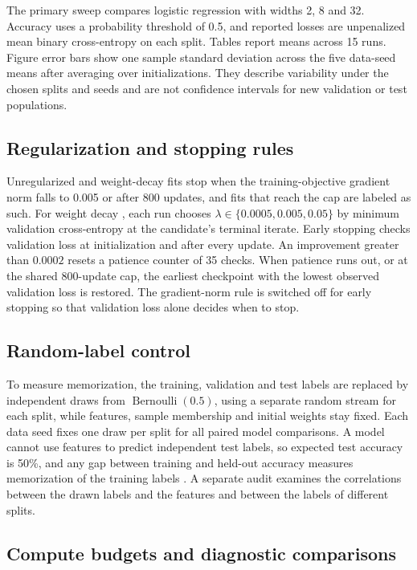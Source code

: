 \documentclass[11pt]{article}
\DeclareMathOperator{\Bernoulli}{Bernoulli}
\begin{document}
The primary sweep compares logistic regression with widths 2, 8 and 32. Accuracy uses a probability threshold of 0.5, and reported losses are unpenalized mean binary cross-entropy on each split. Tables report means across 15 runs. Figure error bars show one sample standard deviation across the five data-seed means after averaging over initializations. They describe variability under the chosen splits and seeds and are not confidence intervals for new validation or test populations.

\subsection{Regularization and stopping rules}

Unregularized and weight-decay fits stop when the training-objective gradient norm falls to 0.005 or after 800 updates, and fits that reach the cap are labeled as such. For weight decay \cite{krogh1992}, each run chooses $\lambda\in\{0.0005,0.005,0.05\}$ by minimum validation cross-entropy at the candidate's terminal iterate. Early stopping \cite{prechelt1998} checks validation loss at initialization and after every update. An improvement greater than $0.0002$ resets a patience counter of 35 checks. When patience runs out, or at the shared 800-update cap, the earliest checkpoint with the lowest observed validation loss is restored. The gradient-norm rule is switched off for early stopping so that validation loss alone decides when to stop.

\subsection{Random-label control}

To measure memorization, the training, validation and test labels are replaced by independent draws from $\Bernoulli(0.5)$, using a separate random stream for each split, while features, sample membership and initial weights stay fixed. Each data seed fixes one draw per split for all paired model comparisons. A model cannot use features to predict independent test labels, so expected test accuracy is 50\%, and any gap between training and held-out accuracy measures memorization of the training labels \cite{zhang2017}. A separate audit examines the correlations between the drawn labels and the features and between the labels of different splits.

\subsection{Compute budgets and diagnostic comparisons}
\end{document}
